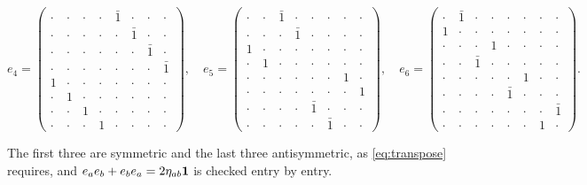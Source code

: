 \begin{center}
\[
e_4=\begin{pmatrix}\cdot&\cdot&\cdot&\cdot&\bar1&\cdot&\cdot&\cdot\\\cdot&\cdot&\cdot&\cdot&\cdot&\bar1&\cdot&\cdot\\\cdot&\cdot&\cdot&\cdot&\cdot&\cdot&\bar1&\cdot\\\cdot&\cdot&\cdot&\cdot&\cdot&\cdot&\cdot&\bar1\\1&\cdot&\cdot&\cdot&\cdot&\cdot&\cdot&\cdot\\\cdot&1&\cdot&\cdot&\cdot&\cdot&\cdot&\cdot\\\cdot&\cdot&1&\cdot&\cdot&\cdot&\cdot&\cdot\\\cdot&\cdot&\cdot&1&\cdot&\cdot&\cdot&\cdot\end{pmatrix},\quad e_5=\begin{pmatrix}\cdot&\cdot&\bar1&\cdot&\cdot&\cdot&\cdot&\cdot\\\cdot&\cdot&\cdot&\bar1&\cdot&\cdot&\cdot&\cdot\\1&\cdot&\cdot&\cdot&\cdot&\cdot&\cdot&\cdot\\\cdot&1&\cdot&\cdot&\cdot&\cdot&\cdot&\cdot\\\cdot&\cdot&\cdot&\cdot&\cdot&\cdot&1&\cdot\\\cdot&\cdot&\cdot&\cdot&\cdot&\cdot&\cdot&1\\\cdot&\cdot&\cdot&\cdot&\bar1&\cdot&\cdot&\cdot\\\cdot&\cdot&\cdot&\cdot&\cdot&\bar1&\cdot&\cdot\end{pmatrix},\quad e_6=\begin{pmatrix}\cdot&\bar1&\cdot&\cdot&\cdot&\cdot&\cdot&\cdot\\1&\cdot&\cdot&\cdot&\cdot&\cdot&\cdot&\cdot\\\cdot&\cdot&\cdot&1&\cdot&\cdot&\cdot&\cdot\\\cdot&\cdot&\bar1&\cdot&\cdot&\cdot&\cdot&\cdot\\\cdot&\cdot&\cdot&\cdot&\cdot&1&\cdot&\cdot\\\cdot&\cdot&\cdot&\cdot&\bar1&\cdot&\cdot&\cdot\\\cdot&\cdot&\cdot&\cdot&\cdot&\cdot&\cdot&\bar1\\\cdot&\cdot&\cdot&\cdot&\cdot&\cdot&1&\cdot\end{pmatrix}.
\]
\end{center}
The first three are symmetric and the last three antisymmetric, as \eqref{eq:transpose} requires, and $e_ae_b+e_be_a=2\eta_{ab}\mathbf 1$ is checked entry by entry.

